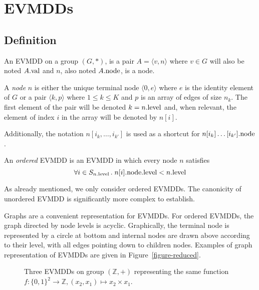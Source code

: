 \documentclass[a4paper,oneside,11pt,pdftex]{llncs}
\newcommand{\Z}{\mathbb{Z}}
\newcommand{\edge}[2]{\langle #1, #2 \rangle}
\newcommand{\val}[1]{#1{\rm .val}}
\newcommand{\node}[1]{#1{\rm .node}}
\newcommand{\level}[1]{#1{\rm .level}}
\begin{document}
\section{EVMDDs}

\subsection{Definition%
  \label{subsection-definition}}

\begin{definition}{\rm  \label{DEF:evmdd}}
An EVMDD on a group $(G, *)$, is a pair $A = \edge{v}{n}$ where $v \in G$ will also 
be noted $\val{A}$ and $n$, also noted $\node{A}$, is a node. 

A \emph{node} $n$ is either the unique terminal node $\langle 0, e \rangle$ where $e$ is the identity element of 
$G$ or a pair $\langle k, p \rangle$ where $1 \leq k \leq K$ and $p$ is an array of edges of size $n_k$. 
The first element of the pair will be denoted $k=\level{n}$ and, when relevant, the element of index $i$ in the array will be denoted by $n[i]$.
\end{definition}

Additionally, the notation $n[i_k, \ldots, i_{k'}]$ is used as a shortcut for
$\node{n[i_k]\ldots[i_{k'}]}$.

\begin{definition}
An \emph{ordered} EVMDD is an EVMDD in which every node $n$ satisfies
$$
\forall i \in S_{\level{n}}\,.\; \level{\node{n[i]}} < \level{n}
$$
\end{definition}

As already mentioned, we only consider ordered EVMDDs.
The canonicity of unordered EVMDD is significantly more complex to establish.

\begin{example}
Graphs are a convenient representation for EVMDDs.
For ordered EVMDDs, the graph directed by node levels is acyclic.
Graphically, the terminal node is represented
by a circle at bottom and internal nodes are drawn above according
to their level, with all edges pointing down to children nodes.
Examples of graph representation of EVMDDs are given in Figure~\vref{figure-reduced}.
\end{example}

\begin{figure}[htbp]
  \centering
    
  \caption{Three EVMDDs on group $(\Z, +)$ representing the same function $f:\{0, 1\}^2\rightarrow\Z, (x_2, x_1)\mapsto x_2\times x_1$.}
\label{figure-reduced}
\end{figure}
\end{document}
